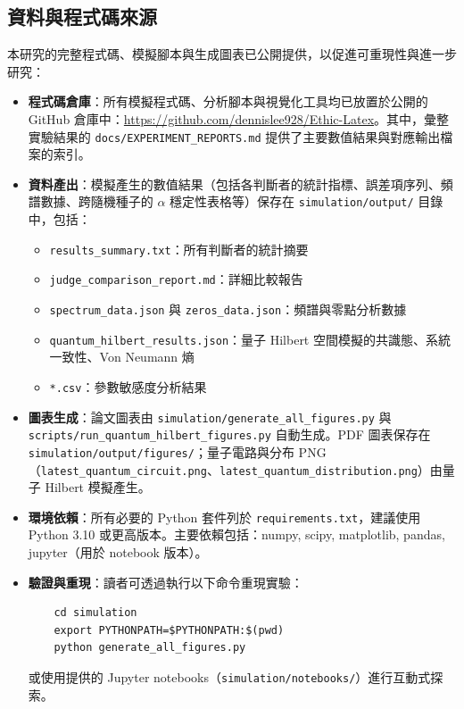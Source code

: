 \documentclass[12pt,a4paper]{article}
\theoremstyle{definition}
\theoremstyle{remark}
\begin{document}
\subsection{資料與程式碼來源}

本研究的完整程式碼、模擬腳本與生成圖表已公開提供，以促進可重現性與進一步研究：

\begin{itemize}
    \item \textbf{程式碼倉庫}：所有模擬程式碼、分析腳本與視覺化工具均已放置於公開的 GitHub 倉庫中：\url{https://github.com/dennislee928/Ethic-Latex}。其中，彙整實驗結果的 \texttt{docs/EXPERIMENT\_REPORTS.md} 提供了主要數值結果與對應輸出檔案的索引。
    \item \textbf{資料產出}：模擬產生的數值結果（包括各判斷者的統計指標、誤差項序列、頻譜數據、跨隨機種子的 $\alpha$ 穩定性表格等）保存在 \texttt{simulation/output/} 目錄中，包括：
    \begin{itemize}
        \item \texttt{results\_summary.txt}：所有判斷者的統計摘要
        \item \texttt{judge\_comparison\_report.md}：詳細比較報告
        \item \texttt{spectrum\_data.json} 與 \texttt{zeros\_data.json}：頻譜與零點分析數據
        \item \texttt{quantum\_hilbert\_results.json}：量子 Hilbert 空間模擬的共識態、系統一致性、Von Neumann 熵
        \item \texttt{*.csv}：參數敏感度分析結果
    \end{itemize}
    \item \textbf{圖表生成}：論文圖表由 \texttt{simulation/generate\_all\_figures.py} 與 \texttt{scripts/run\_quantum\_hilbert\_figures.py} 自動生成。PDF 圖表保存在 \texttt{simulation/output/figures/}；量子電路與分布 PNG（\texttt{latest\_quantum\_circuit.png}、\texttt{latest\_quantum\_distribution.png}）由量子 Hilbert 模擬產生。
    \item \textbf{環境依賴}：所有必要的 Python 套件列於 \texttt{requirements.txt}，建議使用 Python 3.10 或更高版本。主要依賴包括：numpy, scipy, matplotlib, pandas, jupyter（用於 notebook 版本）。
    \item \textbf{驗證與重現}：讀者可透過執行以下命令重現實驗：
    \begin{verbatim}
    cd simulation
    export PYTHONPATH=$PYTHONPATH:$(pwd)
    python generate_all_figures.py
    \end{verbatim}
    或使用提供的 Jupyter notebooks（\texttt{simulation/notebooks/}）進行互動式探索。
\end{itemize}
\end{document}
